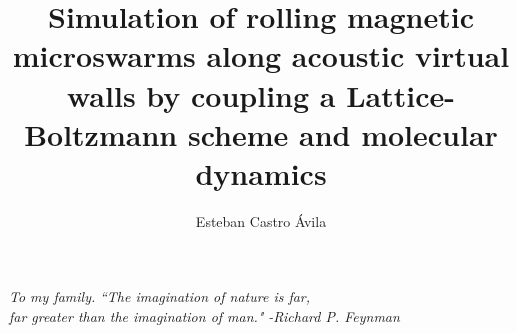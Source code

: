 \documentclass[titlepage]{ucbthesis}
\begin{document}
\renewcommand{\figurename}{Fig.}
\renewcommand{\tablename}{Chart}
\renewcommand{\listtablename}{chart index}
\setlength{\abovecaptionskip}{10pt}
\setlength{\belowcaptionskip}{10pt}

\title{Simulation of rolling magnetic microswarms along acoustic virtual walls by coupling a Lattice-Boltzmann scheme and molecular dynamics}
\author{Esteban Castro \'{A}vila}


\maketitle
\makesubtitle


\begin{frontmatter}

\begin{dedication}
\begin{flushright}
\begin{vplace}
\textit{To my family.}
\vspace{3cm}
\textit{``The imagination of nature is far,\\
far greater than the imagination of man."}
\vspace{0.1cm}
\textit{-Richard P. Feynman}
\end{vplace}
\end{flushright}
\end{dedication}






\tableofcontents
\clearpage
\listoffigures
\clearpage
\listoftables

\end{frontmatter}
\end{document}
